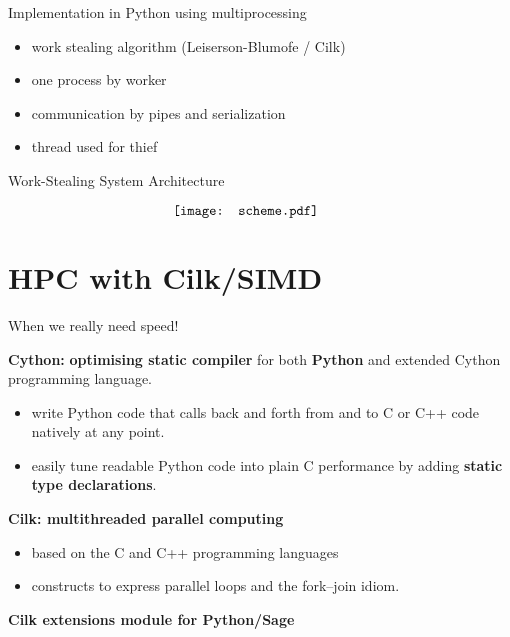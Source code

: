 \documentclass[compress,11pt]{beamer}
\begin{document}
\begin{frame}{Implementation in Python using multiprocessing}

  \begin{itemize}
  \item work stealing algorithm (Leiserson-Blumofe / Cilk)
    \bigskip

  \item one process by worker
    \bigskip

  \item communication by pipes and serialization
    \bigskip

  \item thread used for thief
  \end{itemize}

\end{frame}

\begin{frame}{Work-Stealing System Architecture}

\[\hspace{-0.7cm}\texttt{[image: scheme.pdf]}\]
\end{frame}

\section{HPC with Cilk/SIMD}


\newcommand{\CilkP}{\texttt{Cilk++}\xspace}
\newcommand{\CPP}{\texttt{C++}\xspace}
\newcommand{\MMX}{\texttt{MMX}\xspace}
\newcommand{\SIMD}{\texttt{SIMD}\xspace}
\newcommand{\SSE}{\texttt{SSE}\xspace}
\newcommand{\SSEV}{\texttt{SSE4.1}\xspace}

\begin{frame}[fragile]{When we really need speed!}

  \textbf{Cython:} \textbf{optimising static compiler} for both
  \textbf{Python} and extended Cython programming language.

\begin{itemize}
\item write Python code that calls back and forth from and to C or C++ code
  natively at any point.
\item easily tune readable Python code into plain C performance by adding
  \textbf{static type declarations}.
\end{itemize}
\bigskip\pause

\textbf{Cilk: multithreaded parallel computing}
\begin{itemize}
\item based on the C and C++ programming languages
\item constructs to express parallel loops and the fork–join idiom.
\end{itemize}
\bigskip\pause

\centering \textbf{\Large\color{red}Cilk extensions module for Python/Sage}
\end{frame}
\end{document}
